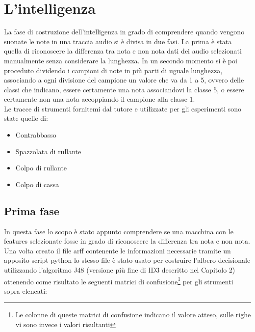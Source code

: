 \chapter{L'intelligenza}
La fase di costruzione dell'intelligenza in grado di comprendere quando vengono suonate le note in una traccia audio si è divisa in due fasi. La prima è stata quella di riconoscere la differenza tra nota e non nota dati dei audio selezionati manualmente senza considerare la lunghezza. In un secondo momento si è poi proceduto dividendo i campioni di note in più parti di uguale lunghezza, associando a ogni divisione del campione un valore che va da 1 a 5, ovvero delle classi che indicano, essere certamente una nota associandovi la classe 5, o essere certamente non una nota accoppiando il campione alla classe 1.\\
Le tracce di strumenti fornitemi dal tutore e utilizzate per gli esperimenti sono state quelle di: 
\begin{itemize}
	\item Contrabbasso
	\item Spazzolata di rullante
	\item Colpo di rullante
	\item Colpo di cassa
\end{itemize}


\section{Prima fase}
In questa fase lo scopo è stato appunto comprendere se una macchina con le features selezionate fosse in grado di riconoscere la differenza tra nota e non nota. Una volta creato il file arff contenente le informazioni necessarie tramite un apposito script python lo stesso file è stato usato per costruire l'albero decisionale utilizzando l'algoritmo J48 (versione più fine di ID3 descritto nel Capitolo 2) ottenendo come risultato le seguenti matrici di confusione\footnote{Le colonne di queste matrici di confusione indicano il valore atteso, sulle righe vi sono invece i valori risultanti} per gli strumenti sopra elencati:\\


\def\myConfMat{{
		{ 114,  10},  %
		{   7,  84},  %
}}

\def\classNames{{"SI","NO"}} %

\def\numClasses{2} %

